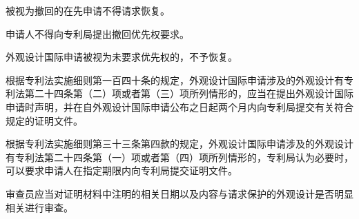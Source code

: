 被视为撤回的在先申请不得请求恢复。

申请人不得向专利局提出撤回优先权要求。

外观设计国际申请被视为未要求优先权的，不予恢复。

根据专利法实施细则第一百四十条的规定，外观设计国际申请涉及的外观设计有专利法第二十四条第（二）项或者第（三）项所列情形的，应当在提出外观设计国际申请时声明，并在自外观设计国际申请公布之日起两个月内向专利局提交有关符合规定的证明文件。

根据专利法实施细则第三十三条第四款的规定，外观设计国际申请涉及的外观设计有专利法第二十四条第（一）项或者第（四）项所列情形的，专利局认为必要时，可以要求申请人在指定期限内向专利局提交证明文件。

审查员应当对证明材料中注明的相关日期以及内容与请求保护的外观设计是否明显相关进行审查。

\stopparttoc
